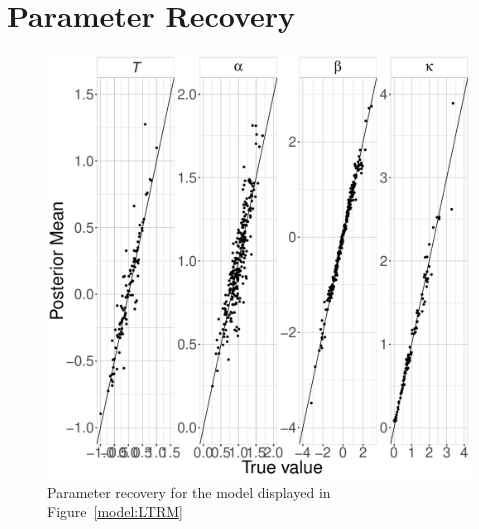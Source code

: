 \documentclass{article}
\begin{document}
\section*{Parameter Recovery}
\begin{figure}[!ht]
	\centering
	\includegraphics[width= \textwidth]{figures/parameterRecoveryModel1.pdf}
	\caption{Parameter recovery for the model displayed in Figure~\ref{model:LTRM}}
	\label{fig:parameterRecoveryM1}
\end{figure}

\end{document}
